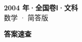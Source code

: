 \documentclass[zihao=-4, a4paper]{ctexart}
\begin{document}
\begin{center}
  {\Large\bfseries 2004 年·全国卷Ⅰ·文科}\\[4pt]
  {\large 数学 · 简答版}
\end{center}
\medskip
{}

\clearpage
{}
\begin{center}{\Large\bfseries 答案速查}\end{center}
\medskip

\end{document}
